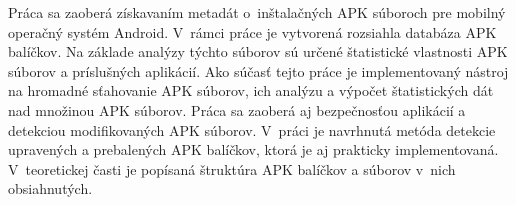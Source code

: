 Práca sa zaoberá získavaním metadát o~inštalačných APK súboroch pre mobilný operačný systém Android. V~rámci práce je vytvorená rozsiahla databáza APK balíčkov. Na základe analýzy týchto súborov sú určené štatistické vlastnosti APK súborov a príslušných aplikácií. Ako súčasť tejto práce je implementovaný nástroj na hromadné sťahovanie APK súborov, ich analýzu a výpočet štatistických dát nad množinou APK súborov. Práca sa zaoberá aj bezpečnosťou aplikácií a detekciou modifikovaných APK súborov. V~práci je navrhnutá metóda detekcie upravených a prebalených APK balíčkov, ktorá je aj prakticky implementovaná. V~teoretickej časti je popísaná štruktúra APK balíčkov a súborov v~nich obsiahnutých. 